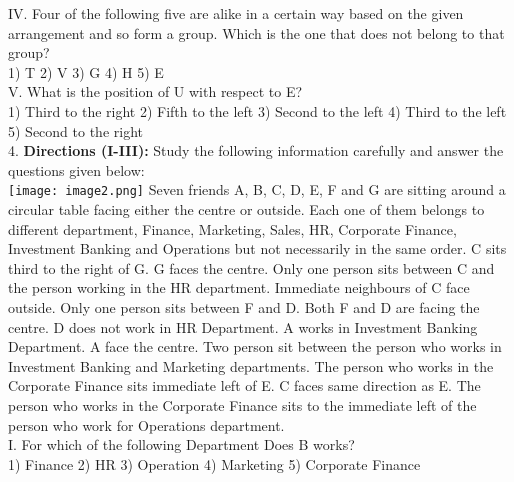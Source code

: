 \documentclass[
]{article}
\begin{document}
IV. Four of the following five are alike in a certain way based on the given arrangement and
so form a group. Which is the one that does not belong to that group?\\
1) T \hspace{2mm}2) V \hspace{2mm}3) G \hspace{2mm}4) H \hspace{2mm}5) E\\

V. What is the position of U with respect to E?\\
1) Third to the right \hspace{2mm}2) Fifth to the left \hspace{2mm}3) Second to the left
\hspace{2mm}4) Third to the left \hspace{2mm}5) Second to the right\\

4. \textbf{Directions (I-III):} Study the following information carefully and answer the questions given
below:\\
\texttt{[image: image2.png]}
Seven friends A, B, C, D, E, F and G are sitting around a circular table facing either the
centre or outside. Each one of them belongs to different department, Finance, Marketing,
Sales, HR, Corporate Finance, Investment Banking and Operations but not necessarily in the
same order. C sits third to the right of G. G faces the centre. Only one person sits between C
and the person working in the HR department. Immediate neighbours of C face outside.
Only one person sits between F and D. Both F and D are facing the centre. D does not work
in HR Department. A works in Investment Banking Department. A face the centre. Two
person sit between the person who works in Investment Banking and Marketing
departments. The person who works in the Corporate Finance sits immediate left of E. C
faces same direction as E. The person who works in the Corporate Finance sits to the
immediate left of the person who work for Operations department.\\

I. For which of the following Department Does B works?\\
1) Finance \hspace{2mm}2) HR \hspace{2mm}3) Operation \hspace{2mm}4) Marketing \hspace{2mm}5) Corporate Finance\\
\end{document}
